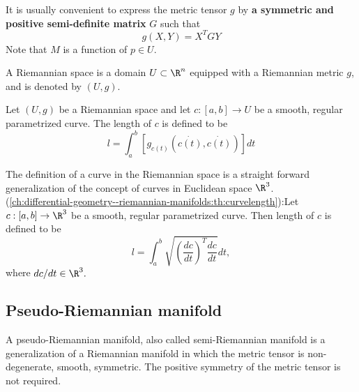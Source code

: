 \begin{refsection}
\begin{remark}
It is usually convenient to express the metric tensor $g$ by \textbf{a symmetric and positive semi-definite matrix} $G$ such that $$g(X,Y) = X^TGY$$
Note that $M$ is a function of $p\in U$.
\end{remark}


\begin{definition}
A Riemannian space is a domain $U\subset \R^n$ equipped with a Riemannian metric $g$, and is denoted by $(U,g)$.
\end{definition}

\begin{definition}
Let $(U,g)$ be a Riemannian space and let $c:[a,b]\to U$ be a smooth, regular parametrized curve. The length of $c$ is defined to be 
$$l = \int_a^b [g_{c(t)}(\dot{c(t)},\dot{c(t)})] dt $$
\end{definition}


\begin{remark}
The definition of a curve in the Riemannian space is a straight forward generalization of the concept of curves in Euclidean space $\R^3$.\\
(\autoref{ch:differential-geometry--riemannian-manifolds:th:curvelength}):Let $c:[a,b]\to \R^3$ be a smooth, regular parametrized curve. Then length of $c$ is defined to be
$$l = \int_{a}^b \sqrt{(\frac{dc}{dt})^T\frac{dc}{dt}}dt,$$
where
$dc/dt \in \R^3.$
\end{remark}



\subsection{Pseudo-Riemannian manifold}
A pseudo-Riemannian manifold, also called semi-Riemannian manifold is a generalization of a Riemannian manifold in which the metric tensor is non-degenerate, smooth, symmetric. The positive symmetry of the metric tensor is not required.  


\end{refsection}
